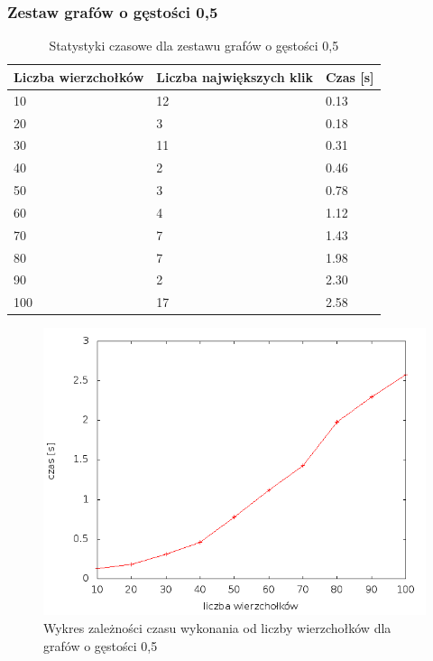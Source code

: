 \documentclass[12pt, a4paper]{article}
\begin{document}
\subsubsection*{Zestaw grafów o gęstości 0,5}
\begin{table}[H]
\caption{Statystyki czasowe dla zestawu grafów o gęstości 0,5}
\begin{center}
    \begin{tabular}{|l|l|l|}
    \hline
    Liczba wierzchołków & Liczba największych klik & Czas [s] \\ \hline
    10 & 12 & 0.13 \\ \hline
    20 & 3 & 0.18 \\ \hline
    30 & 11 & 0.31 \\ \hline
    40 & 2 & 0.46 \\ \hline
    50 & 3 & 0.78 \\ \hline
    60 & 4 & 1.12 \\ \hline
    70 & 7 & 1.43 \\ \hline
    80 & 7 & 1.98 \\ \hline
    90 & 2 & 2.30 \\ \hline
    100 & 17 & 2.58 \\ \hline
    \end{tabular}
\end{center}
\end{table}

\begin{figure}[h]
    \begin{center}
	\includegraphics[scale=0.5]{../experiment_1/img/den/den_05.png}
	\caption{Wykres zależności czasu wykonania od liczby wierzchołków dla grafów o gęstości 0,5}
    \end{center}
\end{figure}
\end{document}
